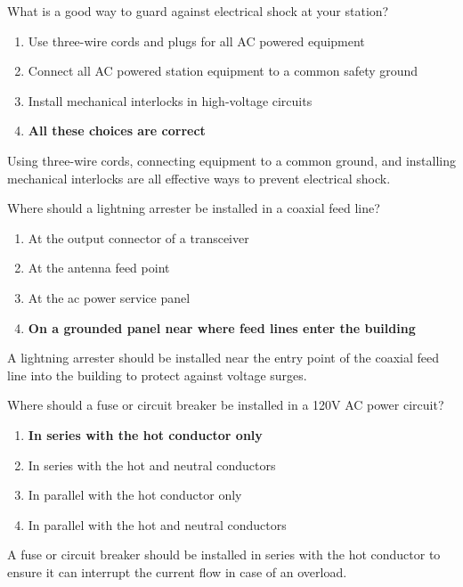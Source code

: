 
\begin{tcolorbox}[colback=gray!10!white,colframe=black!75!black,title={T0A06}]
    What is a good way to guard against electrical shock at your station?
    \begin{enumerate}[label=\Alph*,noitemsep]
        \item Use three-wire cords and plugs for all AC powered equipment
        \item Connect all AC powered station equipment to a common safety ground
        \item Install mechanical interlocks in high-voltage circuits
        \item \textbf{All these choices are correct}
    \end{enumerate}
\end{tcolorbox}
Using three-wire cords, connecting equipment to a common ground, and installing mechanical interlocks are all effective ways to prevent electrical shock.


\begin{tcolorbox}[colback=gray!10!white,colframe=black!75!black,title={T0A07}]
    Where should a lightning arrester be installed in a coaxial feed line?
    \begin{enumerate}[label=\Alph*,noitemsep]
        \item At the output connector of a transceiver
        \item At the antenna feed point
        \item At the ac power service panel
        \item \textbf{On a grounded panel near where feed lines enter the building}
    \end{enumerate}
\end{tcolorbox}
A lightning arrester should be installed near the entry point of the coaxial feed line into the building to protect against voltage surges.


\begin{tcolorbox}[colback=gray!10!white,colframe=black!75!black,title={T0A08}]
    Where should a fuse or circuit breaker be installed in a 120V AC power circuit?
    \begin{enumerate}[label=\Alph*,noitemsep]
        \item \textbf{In series with the hot conductor only}
        \item In series with the hot and neutral conductors
        \item In parallel with the hot conductor only
        \item In parallel with the hot and neutral conductors
    \end{enumerate}
\end{tcolorbox}
A fuse or circuit breaker should be installed in series with the hot conductor to ensure it can interrupt the current flow in case of an overload.

